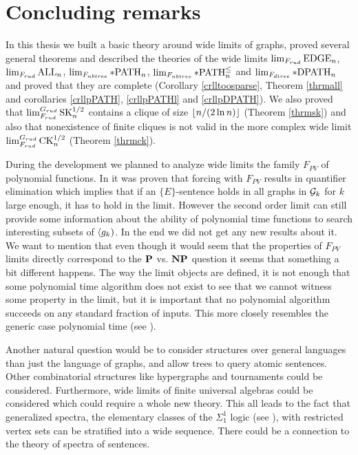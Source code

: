 \chapter*{Concluding remarks}

In this thesis we built a basic theory around wide limits of graphs, proved several general theorems and described the theories of the wide limits $\lim_{F_{rud}}\EDGE_n$, $\lim_{F_{rud}}\ALL_n$, $\lim_{F_{nbtree}}\pPATH_n$, $\lim_{F_{nbtree}}\pPATHl_n$ and $\lim_{F_{dtree}}\pDPATH_n$ and proved that they are complete (Corollary \ref{crlltoosparse}, Theorem \ref{thrmall} and corollaries \ref{crllpPATH}, \ref{crllpPATHl} and \ref{crllpDPATH}).  We also proved that $\lim_{F_{rud}}^{G_{rud}}\SK_n^{1/2}$ contains a clique of size $\floor{n/(2\ln n)}$ (Theorem \ref{thrmsk}) and also that nonexistence of finite cliques is not valid in the more complex wide limit $\lim_{F_{rud}}^{G_{rud}}\CK_n^{1/2}$ (Theorem \ref{thrmck}).

During the development we planned to analyze wide limits the family $F_{PV}$ of polynomial functions. In \cite{krajicek2010forcing} it was proven that forcing with $F_{PV}$ results in quantifier elimination which implies that if an $\{E\}$-sentence holds in all graphs in $\G_k$ for $k$ large enough, it has to hold in the limit. However the second order limit can still provide some information about the ability of polynomial time functions to search interesting subsets of $\set{g_k}$. In the end we did not get any new results about it. We want to mention that even though it would seem that the properties of $F_{PV}$ limits directly correspond to the $\P$ vs. $\NP$ question it seems that something a bit different happens. The way the limit objects are defined, it is not enough that some polynomial time algorithm does not exist to see that we cannot witness some property in the limit, but it is important that no polynomial algorithm succeeds on any standard fraction of inputs. This more closely resembles the generic case polynomial time (see \cite{gilman2007report}).

Another natural question would be to consider structures over general languages than just the language of graphs, and allow trees to query atomic sentences. Other combinatorial structures like hypergraphs and tournaments could be considered. Furthermore, wide limits of finite universal algebras could be considered which could require a whole new theory. This all leads to the fact that generalized spectra, the elementary classes of the $\Sigma_1^1$ logic (see \cite{Fagin74}), with restricted vertex sets can be stratified into a wide sequence. There could be a connection to the theory of spectra of sentences.


